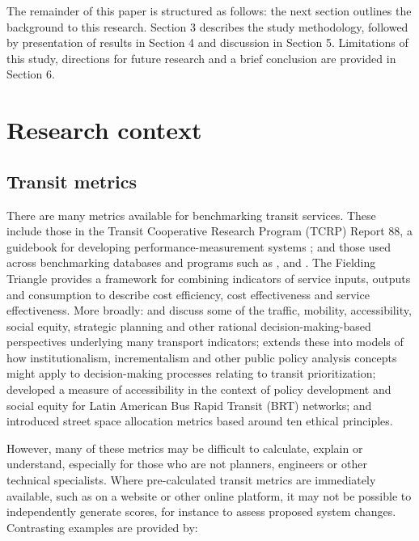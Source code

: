 \documentclass[preprint, 3p,
authoryear]{elsarticle} %
\begin{document}
The remainder of this paper is structured as follows: the next section
outlines the background to this research. Section 3 describes the study
methodology, followed by presentation of results in Section 4 and
discussion in Section 5. Limitations of this study, directions for
future research and a brief conclusion are provided in Section 6.

\hypertarget{research-context}{%
\section{Research context}\label{research-context}}

\hypertarget{transit-metrics}{%
\subsection{Transit metrics}\label{transit-metrics}}

There are many metrics available for benchmarking transit services.
These include those in the Transit Cooperative Research Program (TCRP)
Report 88, a guidebook for developing performance-measurement systems
\citep{Ryus:2003aa}; and those used across benchmarking databases and
programs such as \citet{Florida-Transit-Information-System:2018aa},
\citet{UITP:2015aa} and \citet{Imperial-College-London:2023aa}. The
Fielding Triangle \citep{FieldingGordonJ1987Mpts} provides a framework
for combining indicators of service inputs, outputs and consumption to
describe cost efficiency, cost effectiveness and service effectiveness.
More broadly: \citet{Litman:2003ab} and \citet{Litman:2016aa} discuss
some of the traffic, mobility, accessibility, social equity, strategic
planning and other rational decision-making-based perspectives
underlying many transport indicators; \citet{Reynolds:2017ah} extends
these into models of how institutionalism, incrementalism and other
public policy analysis concepts might apply to decision-making processes
relating to transit prioritization; \citet{GuzmanLuisA.2017Aeit}
developed a measure of accessibility in the context of policy
development and social equity for Latin American Bus Rapid Transit (BRT)
networks; and \citet{Creutzig2020streetspaceallocation} introduced
street space allocation metrics based around ten ethical principles.

However, many of these metrics may be difficult to calculate, explain or
understand, especially for those who are not planners, engineers or
other technical specialists. Where pre-calculated transit metrics are
immediately available, such as on a website or other online platform, it
may not be possible to independently generate scores, for instance to
assess proposed system changes. Contrasting examples are provided by:
\end{document}
